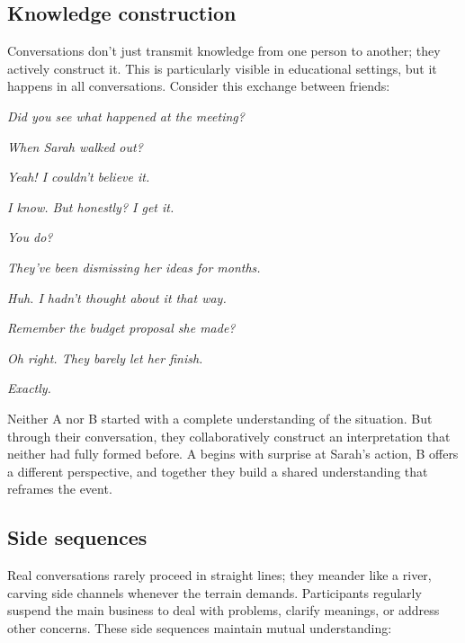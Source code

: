 \subsection{Knowledge construction} \label{subsec:knowledge}

Conversations don't just transmit knowledge from one person to another; they actively construct it. This is particularly visible in educational settings, but it happens in all conversations. Consider this exchange between friends:

\ea
\begin{dialogue}
\item[A] \emph{Did you see what happened at the meeting?}
\item[B] \emph{When Sarah walked out?}
\item[A] \emph{Yeah! I couldn't believe it.}
\item[B] \emph{I know. But honestly? I get it.}
\item[A] \emph{You do?}
\item[B] \emph{They've been dismissing her ideas for months.}
\item[A] \emph{Huh. I hadn't thought about it that way.}
\item[B] \emph{Remember the budget proposal she made?}
\item[A] \emph{Oh right. They barely let her finish.}
\item[B] \emph{Exactly.}
\end{dialogue}
\z
Neither A nor B started with a complete understanding of the situation. But through their conversation, they collaboratively construct an interpretation that neither had fully formed before. A begins with surprise at Sarah's action, B offers a different perspective, and together they build a shared understanding that reframes the event.

\subsection{Side sequences} \label{subsec:side-seq}

Real conversations rarely proceed in straight lines; they meander like a river, carving side channels whenever the terrain demands. Participants regularly suspend the main business to deal with problems, clarify meanings, or address other concerns. These side sequences maintain mutual understanding:

